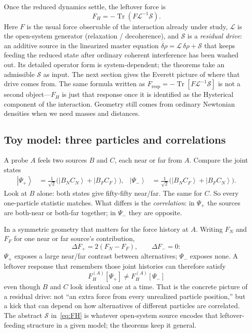 \documentclass[11pt]{article}
\theoremstyle{remark}
\newcommand{\Tr}{\operatorname{Tr}}
\newcommand{\ket}[1]{\left|#1\right\rangle}
\begin{document}
Once the reduced dynamics settle, the leftover force is
\begin{equation}
  F_H=-\Tr\!\left(F\mathcal L^{-1}\mathcal S\right).
  \label{eq:FH}
\end{equation}
Here $F$ is the usual force observable of the interaction already under study, $\mathcal L$ is the open-system generator (relaxation / decoherence), and $\mathcal S$ is a \emph{residual drive}: an additive source in the linearized master equation $\dot{\delta\rho}=\mathcal L\,\delta\rho+\mathcal S$ that keeps feeding the reduced state after ordinary coherent interference has been washed out.
Its detailed operator form is system-dependent; the theorems take an admissible $\mathcal S$ as input.
The next section gives the Everett picture of where that drive comes from.
The same formula written as $F_{\mathrm{resp}}=-\Tr[F\mathcal L^{-1}\mathcal S]$ is not a second object---$F_H$ is just that response once it is identified as the Hysterical component of the interaction.
Geometry still comes from ordinary Newtonian densities when we need masses and distances.

\subsection*{Toy model: three particles and correlations}
A probe $A$ feels two sources $B$ and $C$, each near or far from $A$. Compare the joint states
\begin{align}
  \ket{\Psi_+}&=\frac{1}{\sqrt2}\bigl(\ket{B_NC_N}+\ket{B_FC_F}\bigr),&
  \ket{\Psi_-}&=\frac{1}{\sqrt2}\bigl(\ket{B_NC_F}+\ket{B_FC_N}\bigr).
\end{align}
Look at $B$ alone: both states give fifty-fifty near/far. The same for $C$. So every one-particle statistic matches.
What differs is the \emph{correlation}: in $\Psi_+$ the sources are both-near or both-far together; in $\Psi_-$ they are opposite.

In a symmetric geometry that matters for the force history at $A$. Writing $F_N$ and $F_F$ for one near or far source's contribution,
\begin{equation}
  \Delta F_+=2(F_N-F_F),\qquad \Delta F_-=0:
\end{equation}
$\Psi_+$ exposes a large near/far contrast between alternatives; $\Psi_-$ exposes none.
A leftover response that remembers those joint histories can therefore satisfy
\begin{equation}
  F_H^{(A)}[\Psi_+]\neq F_H^{(A)}[\Psi_-]
\end{equation}
even though $B$ and $C$ look identical one at a time.
That is the concrete picture of a residual drive: not ``an extra force from every unrealized particle position,'' but a kick that can depend on how alternatives of different particles are correlated.
The abstract $\mathcal S$ in~\eqref{eq:FH} is whatever open-system source encodes that leftover-feeding structure in a given model; the theorems keep it general.
\end{document}
